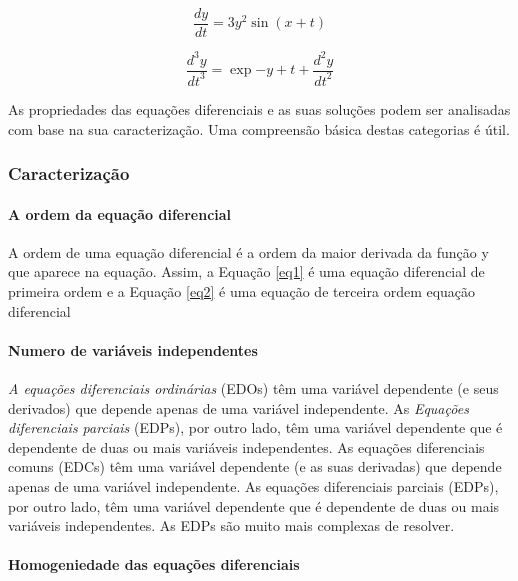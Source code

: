 \documentclass[11pt, letterpaper, portuguese]{article}
\begin{document}
\begin{equation}
    \frac{d y}{d t}=3 y^2 \sin{\left( x+t  \right)}
    \label{eq1}
\end{equation}

\begin{equation}
    \frac{d^3 y}{{d t}^3}=\exp{-y} + t + \frac{d^2 y}{{d t}^2}
    \label{eq2}
\end{equation}

\par{As propriedades das equações diferenciais e as suas soluções podem ser analisadas com base na sua caracterização. Uma compreensão básica destas categorias é útil.
}


\subsubsection{Caracterização}

    \paragraph{A ordem da equação diferencial
}
    
    \par{A ordem de uma equação diferencial é a ordem da maior derivada da função y que aparece na equação. Assim, a Equação \ref{eq1}  é uma equação diferencial de primeira ordem e a Equação \ref{eq2} é uma equação de terceira ordem equação diferencial}
    
    \paragraph{Numero de variáveis independentes}
    
    \par{\textit{A equações diferenciais ordinárias} (EDOs) têm uma variável dependente (e seus derivados) que depende apenas de uma variável independente. As \textit{Equações diferenciais parciais} (EDPs), por outro lado, têm uma variável dependente que é dependente de duas ou mais variáveis independentes. As equações diferenciais comuns (EDCs) têm uma variável dependente (e as suas derivadas) que depende apenas de uma variável independente. As equações diferenciais parciais (EDPs), por outro lado, têm uma variável dependente que é dependente de duas ou mais variáveis independentes. As EDPs são muito mais complexas de resolver.}
    
    \paragraph{Homogeniedade das equações diferenciais}
    
\end{document}
